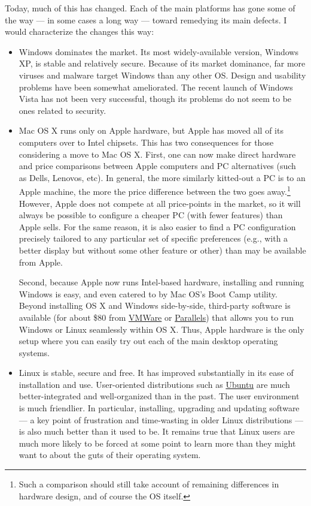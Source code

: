 \documentclass[11pt,article,oneside]{memoir}
\begin{document}
Today, much of this has changed. Each of the main platforms has gone some of the way --- in some cases a long way --- toward remedying its main defects. I would characterize the changes this way: 

\begin{itemize}
	\item Windows dominates the market. Its most widely-available version, Windows XP, is stable and relatively secure. Because of its market dominance, far more viruses and malware target Windows than any other OS. Design and usability problems have been somewhat ameliorated. The recent launch of Windows Vista has not been very successful, though its problems do not seem to be ones related to security.

	\item Mac OS X runs only on Apple hardware, but Apple has moved all of its computers over to Intel chipsets. This has two consequences for those considering a move to Mac OS X. First, one can now make direct hardware and price comparisons between Apple computers and PC alternatives (such as Dells, Lenovos, etc). In general, the more similarly kitted-out a PC is to an Apple machine, the more the price difference between the two goes away.\footnote{Such a comparison should still take account of remaining differences in hardware design, and of course the OS itself.} However, Apple does not compete at all price-points in the market, so it will always be possible to configure a cheaper PC (with fewer features) than Apple sells. For the same reason, it is also easier to find a PC configuration precisely tailored to any particular set of specific preferences (e.g., with a better display but without some other feature or other) than may be available from Apple. 
	
	Second, because Apple now runs Intel-based hardware, installing and running Windows is easy, and even catered to by Mac OS's Boot Camp utility. Beyond installing OS X and Windows side-by-side, third-party software is available (for about \$80 from \href{http://www.vmware.com/products/fusion/}{VMWare} or \href{http://www.parallels.com/}{Parallels}) that allows you to run Windows or Linux seamlessly within OS X. Thus, Apple hardware is the only setup where you can easily try out each of the main desktop operating systems. 
	\item Linux is stable, secure and free. It has improved substantially in its ease of installation and use. User-oriented distributions such as \href{http://www.ubuntu.com/}{Ubuntu} are much better-integrated and well-organized than in the past. The user environment is much friendlier. In particular, installing, upgrading and updating software --- a key point of frustration and time-wasting in older Linux distributions --- is also much better than it used to be. It remains true that Linux users are much more likely to be forced at some point to learn more than they might want to about the guts of their operating system.
	
\end{itemize}
\end{document}

